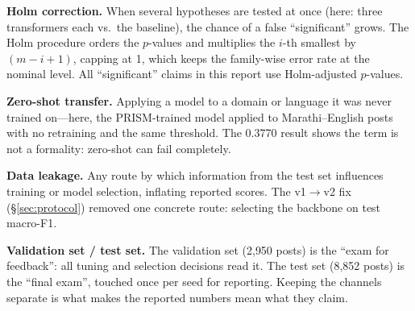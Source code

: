 \textbf{Holm correction.} When several hypotheses are tested at once (here: three
transformers each vs.\ the baseline), the chance of a false ``significant'' grows.
The Holm procedure orders the $p$-values and multiplies the $i$-th smallest by
$(m - i + 1)$, capping at 1, which keeps the family-wise error rate at the nominal
level. All ``significant'' claims in this report use Holm-adjusted $p$-values.

\textbf{Zero-shot transfer.} Applying a model to a domain or language it was never
trained on---here, the PRISM-trained model applied to Marathi--English posts with
no retraining and the same threshold. The 0.3770 result shows the term is not a
formality: zero-shot can fail completely.

\textbf{Data leakage.} Any route by which information from the test set influences
training or model selection, inflating reported scores. The v1$\rightarrow$v2 fix
(\S\ref{sec:protocol}) removed one concrete route: selecting the backbone on test
macro-F1.

\textbf{Validation set / test set.} The validation set (2{,}950 posts) is the
``exam for feedback'': all tuning and selection decisions read it. The test set
(8{,}852 posts) is the ``final exam'', touched once per seed for reporting.
Keeping the channels separate is what makes the reported numbers mean what they
claim.
\endgroup
